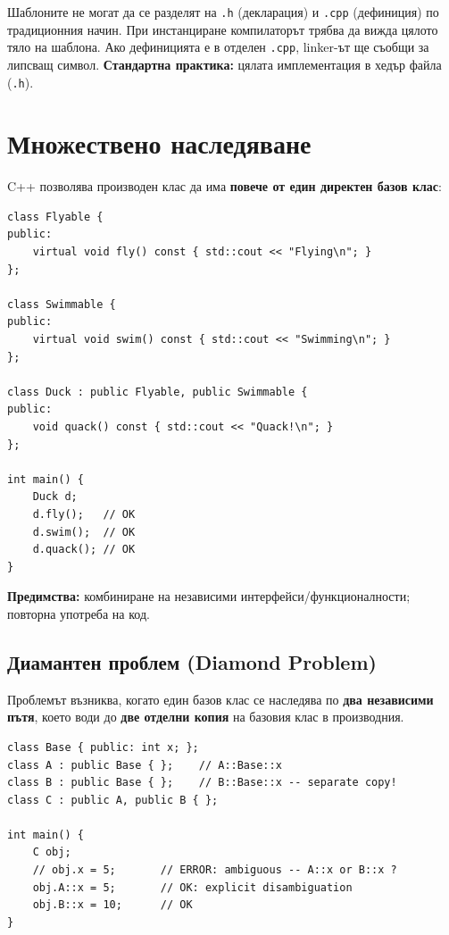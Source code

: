 \documentclass{scrartcl}
\begin{document}
\begin{FlushLeft}
Шаблоните не могат да се разделят на \texttt{.h} (декларация) и \texttt{.cpp} (дефиниция) по традиционния начин. При инстанциране компилаторът трябва да вижда цялото тяло на шаблона. Ако дефиницията е в отделен \texttt{.cpp}, linker-ът ще съобщи за липсващ символ. \textbf{Стандартна практика:} цялата имплементация в хедър файла (\texttt{.h}).

\section{Множествено наследяване}

C++ позволява производен клас да има \textbf{повече от един директен базов клас}:

\begin{lstlisting}
class Flyable {
public:
    virtual void fly() const { std::cout << "Flying\n"; }
};

class Swimmable {
public:
    virtual void swim() const { std::cout << "Swimming\n"; }
};

class Duck : public Flyable, public Swimmable {
public:
    void quack() const { std::cout << "Quack!\n"; }
};

int main() {
    Duck d;
    d.fly();   // OK
    d.swim();  // OK
    d.quack(); // OK
}
\end{lstlisting}

\textbf{Предимства:} комбиниране на независими интерфейси/функционалности; повторна употреба на код.

\subsection{Диамантен проблем (Diamond Problem)}

Проблемът възниква, когато един базов клас се наследява по \textbf{два независими пътя}, което води до \textbf{две отделни копия} на базовия клас в производния.

\begin{lstlisting}
class Base { public: int x; };
class A : public Base { };    // A::Base::x
class B : public Base { };    // B::Base::x -- separate copy!
class C : public A, public B { };

int main() {
    C obj;
    // obj.x = 5;       // ERROR: ambiguous -- A::x or B::x ?
    obj.A::x = 5;       // OK: explicit disambiguation
    obj.B::x = 10;      // OK
}
\end{lstlisting}


\end{FlushLeft}
\end{document}
